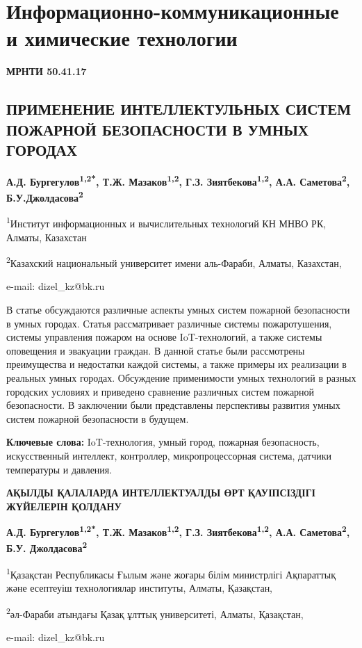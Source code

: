 \let\cleardoublepage\clearpage
\chapter{Информационно-коммуникационные и химические технологии}

{\bfseries МРНТИ 50.41.17}

\section{ПРИМЕНЕНИЕ ИНТЕЛЛЕКТУЛЬНЫХ СИСТЕМ ПОЖАРНОЙ БЕЗОПАСНОСТИ В УМНЫХ ГОРОДАХ}
\begin{center}
{\bfseries А.Д. Бургегулов\textsuperscript{1,2*}, Т.Ж.
Мазаков\textsuperscript{1,2}, Г.З. Зиятбекова\textsuperscript{1,2}, А.А.
Саметова\textsuperscript{2}, Б.У.Джолдасова\textsuperscript{2}}

\textsuperscript{1}Институт информационных и вычислительных технологий
КН МНВО РК, Алматы, Казахстан

\textsuperscript{2}Казахский национальный университет имени аль-Фараби,
Алматы, Казахстан,

e-mail: dizel\_kz@bk.ru
\end{center}

В статье обсуждаются различные аспекты умных систем пожарной
безопасности в умных городах. Статья рассматривает различные системы
пожаротушения, системы управления пожаром на основе IoT-технологий, а
также системы оповещения и эвакуации граждан. В данной статье были
рассмотрены преимущества и недостатки каждой системы, а также примеры их
реализации в реальных умных городах. Обсуждение применимости умных
технологий в разных городских условиях и приведено сравнение различных
систем пожарной безопасности. В заключении были представлены перспективы
развития умных систем пожарной безопасности в будущем.

{\bfseries Ключевые слова:} IoT-технология, умный город, пожарная
безопасность, искусственный интеллект, контроллер, микропроцессорная
система, датчики температуры и давления.

\begin{center}
{\large\bfseries АҚЫЛДЫ ҚАЛАЛАРДА ИНТЕЛЛЕКТУАЛДЫ ӨРТ ҚАУІПСІЗДІГІ ЖҮЙЕЛЕРІН ҚОЛДАНУ}

\vspace{1em}
{\bfseries А.Д. Бургегулов\textsuperscript{1,2*}, Т.Ж.
Мазаков\textsuperscript{1,2}, Г.З. Зиятбекова\textsuperscript{1,2}, А.А.
Саметова\textsuperscript{2}, Б.У. Джолдасова\textsuperscript{2}}

\textsuperscript{1}Қазақстан Республикасы Ғылым және жоғары білім
министрлігі Ақпараттық және есептеуіш технологиялар институты, Алматы,
Қазақстан,

\textsuperscript{2}әл-Фараби атындағы Қазақ ұлттық университеті, Алматы,
Қазақстан,

e-mail: dizel\_kz@bk.ru
\end{center}

